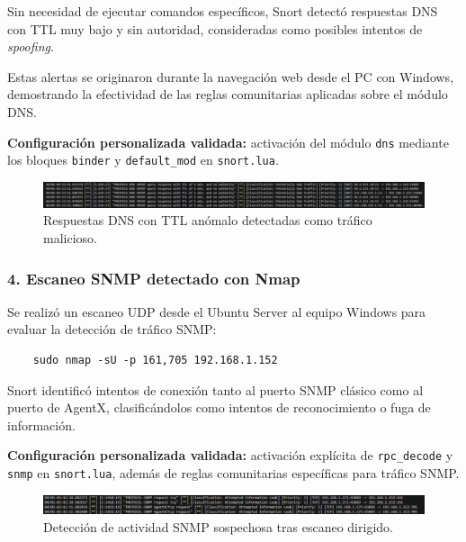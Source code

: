 \documentclass[11pt,a4paper,twoside]{report}
\begin{document}
Sin necesidad de ejecutar comandos específicos, Snort detectó respuestas DNS con TTL muy bajo y sin autoridad, consideradas como posibles intentos de \textit{spoofing}.\newline

Estas alertas se originaron durante la navegación web desde el PC con Windows, demostrando la efectividad de las reglas comunitarias aplicadas sobre el módulo DNS.

\textbf{Configuración personalizada validada:} activación del módulo \texttt{dns} mediante los bloques \texttt{binder} y \texttt{default\_mod} en \texttt{snort.lua}.

\begin{figure}[H]
	\centering
	\includegraphics[width=\textwidth]{pruebas/2.png}
	\caption{Respuestas DNS con TTL anómalo detectadas como tráfico malicioso.}
\end{figure}

\vspace{0.5cm}

\subsubsection*{4. Escaneo SNMP detectado con Nmap}

Se realizó un escaneo UDP desde el Ubuntu Server al equipo Windows para evaluar la detección de tráfico SNMP:

\begin{verbatim}
	sudo nmap -sU -p 161,705 192.168.1.152
\end{verbatim}

Snort identificó intentos de conexión tanto al puerto SNMP clásico como al puerto de AgentX, clasificándolos como intentos de reconocimiento o fuga de información.\newline

\textbf{Configuración personalizada validada:} activación explícita de \texttt{rpc\_decode} y \texttt{snmp} en \texttt{snort.lua}, además de reglas comunitarias específicas para tráfico SNMP.

\begin{figure}[H]
	\centering
	\includegraphics[width=\textwidth]{pruebas/5.png}
	\caption{Detección de actividad SNMP sospechosa tras escaneo dirigido.}
\end{figure}
\end{document}
